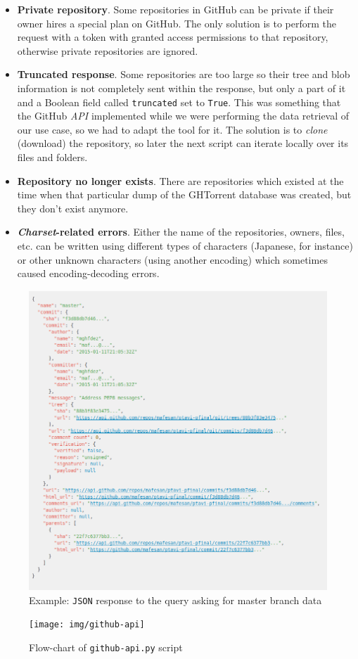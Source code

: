 \documentclass[a4paper, 12pt]{book}
\begin{document}
\begin{itemize}
  \item \textbf{Private repository}. Some repositories in GitHub can be private if their owner hires a special
  plan on GitHub. The only solution is to perform the request with
  a token with granted access permissions to that repository, otherwise private repositories are ignored.
  \item \textbf{Truncated response}. Some repositories are too large so their tree and blob information is not completely
  sent within the response, but only a part of it and a Boolean field called \texttt{truncated} set to \texttt{True}.
  This was something that the GitHub \textit{API} implemented while we were performing the data retrieval of our
  use case, so we had to adapt the tool for it. The solution is to \textit{clone} (download) the repository,
  so later the next script can iterate locally over its files and folders.
  \item \textbf{Repository no longer exists}. There are repositories which existed at the time when that particular
  dump of the GHTorrent database was created, but they don't exist anymore.
  \item \textbf{\textit{Charset}-related errors}. Either the name of the repositories, owners, files, etc. can be written
  using different types of characters (Japanese, for instance) or other unknown characters (using another encoding)
  which sometimes caused encoding-decoding errors.
\end{itemize}
\label{sec:data-extraction}
\begin{figure}
  \centering
  \includegraphics[width=13cm, keepaspectratio]{img/gh-api-master-json-example}
  \caption{Example: \texttt{JSON} response to the query asking for master branch data}
  \label{fig:gh-api-master-json}
\end{figure}
\begin{figure}
  \centering
  \texttt{[image: img/github-api]}
  \caption{Flow-chart of \texttt{github-api.py} script}
  \label{fig:gh-api-diagram}
\end{figure}
\end{document}
